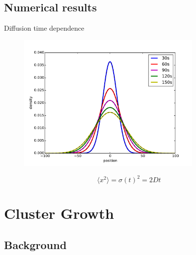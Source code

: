 \documentclass{beamer}
\begin{document}
\subsection{Numerical results}

\begin{frame}{Diffusion time dependence}
	
	\begin{figure}[H]
		\centering
		\includegraphics[width=0.8\textwidth]{diffusion.pdf}
	\end{figure}
	\begin{equation*}
	\langle x^2\rangle=\sigma(t)^2=2Dt
	\end{equation*}
	
\end{frame}


\section{Cluster Growth}


\subsection{Background}
\end{document}
